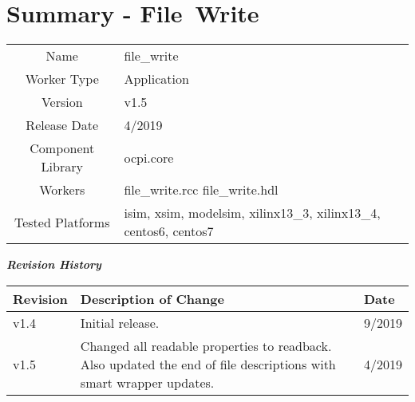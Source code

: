 \documentclass{article}
\author{} %
\date{Version \docVersion} %
\title{\docTitle}
\def\docVersion{1.5}
\def\comp{file\_write}
\def\Comp{File\ Write }
\begin{document}
\section*{Summary - \Comp}
\begin{tabular}{|c|M{13.5cm}|}
	\hline
	                  &                                                                                \\
	\hline
	Name              & \comp                                                                          \\
	\hline
	Worker Type       & Application                                                                    \\
	\hline
	Version           &  v\docVersion \\
	\hline
	Release Date      &  4/2019 \\
	\hline
	Component Library &   ocpi.core\\
	\hline
	Workers           &  file\_write.rcc file\_write.hdl\\
	\hline
	Tested Platforms  &  isim, xsim, modelsim, xilinx13\_3, xilinx13\_4, centos6, centos7\\
	\hline
\end{tabular}

\begin{center}
  \textit{\textbf{Revision History}}
\end{center}
\begin{longtable}{|p{}
                  |p{}
                  |p{}|}
  \hline
  \rowcolor{blue}
  \textbf{Revision} & \textbf{Description of Change} & \textbf{Date} \\
  \hline
  v1.4 & Initial release. & 9/2019 \\
  \hline
  v1.5 & Changed all readable properties to readback.  Also updated the end of file descriptions with smart wrapper updates.  & 4/2019 \\
  \hline
\end{longtable}
\end{document}
